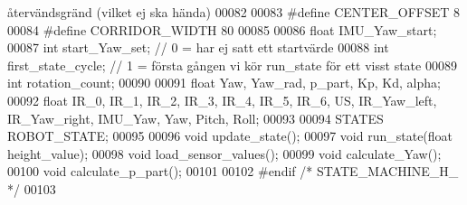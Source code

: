 \begin{DoxyCode}
{       återvändsgränd (vilket ej ska hända)}
00082 
00083 \textcolor{preprocessor}{#define CENTER\_OFFSET 8}
00084 \textcolor{preprocessor}{#define CORRIDOR\_WIDTH 80}
00085 
00086 \textcolor{keywordtype}{float} IMU\_Yaw\_start;
00087 \textcolor{keywordtype}{int} start\_Yaw\_set;      \textcolor{comment}{// 0 = har ej satt ett startvärde}
00088 \textcolor{keywordtype}{int} first\_state\_cycle;      \textcolor{comment}{// 1 = första gången vi kör run\_state för ett visst state}
00089 \textcolor{keywordtype}{int} rotation\_count;
00090 
00091 \textcolor{keywordtype}{float} Yaw, Yaw\_rad, p\_part, Kp, Kd, alpha;
00092 \textcolor{keywordtype}{float} IR\_0, IR\_1, IR\_2, IR\_3, IR\_4, IR\_5, IR\_6, US, IR\_Yaw\_left, IR\_Yaw\_right, IMU\_Yaw, Yaw, Pitch, Roll;
00093 
00094 STATES ROBOT\_STATE;
00095 
00096 \textcolor{keywordtype}{void} update\_state();
00097 \textcolor{keywordtype}{void} run\_state(\textcolor{keywordtype}{float} height\_value);
00098 \textcolor{keywordtype}{void} load\_sensor\_values();
00099 \textcolor{keywordtype}{void} calculate\_Yaw();
00100 \textcolor{keywordtype}{void} calculate\_p\_part();
00101 
00102 \textcolor{preprocessor}{#endif }\textcolor{comment}{/* STATE\_MACHINE\_H\_ */}\textcolor{preprocessor}{}
00103 
\end{DoxyCode}
